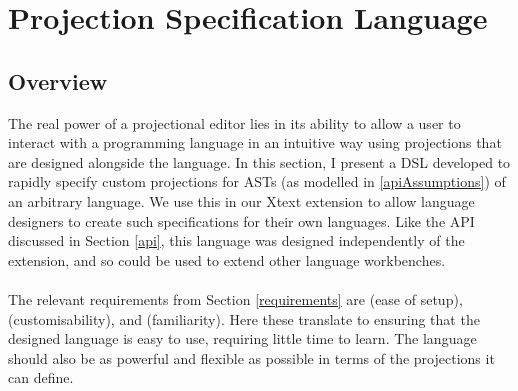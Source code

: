 \documentclass{article}
\begin{document}
{%

\section{Projection Specification Language}\label{EditorLanguage}
\subsection{Overview}
The real power of a projectional editor lies in its ability to allow a user to interact with a programming language in an intuitive way using projections that are designed alongside the language. In this section, I present a DSL developed to rapidly specify custom projections for ASTs (as modelled in \ref{apiAssumptions}) of an arbitrary language. We use this in our Xtext extension to allow language designers to create such specifications for their own languages. Like the API discussed in Section \ref{api}, this language was designed independently of the extension, and so could be used to extend other language workbenches.
\\
\\
The relevant requirements from Section \ref{requirements} are \RSetup (ease of setup), \RCustom (customisability), and \RFamiliarity (familiarity). Here these translate to ensuring that the designed language is easy to use, requiring little time to learn. The language should also be as powerful and flexible as possible in terms of the projections it can define.

}
\end{document}
